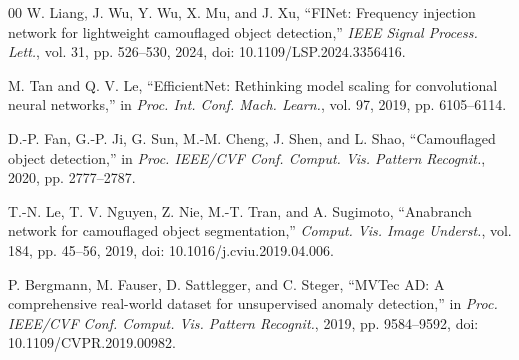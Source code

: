 \documentclass[conference,letterpaper]{IEEEtran}
\begin{document}
\begin{thebibliography}{00}
W. Liang, J. Wu, Y. Wu, X. Mu, and J. Xu, ``FINet: Frequency injection network for lightweight camouflaged object detection,'' \textit{IEEE Signal Process. Lett.}, vol. 31, pp. 526--530, 2024, doi: 10.1109/LSP.2024.3356416.

M. Tan and Q. V. Le, ``EfficientNet: Rethinking model scaling for convolutional neural networks,'' in \textit{Proc. Int. Conf. Mach. Learn.}, vol. 97, 2019, pp. 6105--6114.

D.-P. Fan, G.-P. Ji, G. Sun, M.-M. Cheng, J. Shen, and L. Shao, ``Camouflaged object detection,'' in \textit{Proc. IEEE/CVF Conf. Comput. Vis. Pattern Recognit.}, 2020, pp. 2777--2787.

T.-N. Le, T. V. Nguyen, Z. Nie, M.-T. Tran, and A. Sugimoto, ``Anabranch network for camouflaged object segmentation,'' \textit{Comput. Vis. Image Underst.}, vol. 184, pp. 45--56, 2019, doi: 10.1016/j.cviu.2019.04.006.

P. Bergmann, M. Fauser, D. Sattlegger, and C. Steger, ``MVTec AD: A comprehensive real-world dataset for unsupervised anomaly detection,'' in \textit{Proc. IEEE/CVF Conf. Comput. Vis. Pattern Recognit.}, 2019, pp. 9584--9592, doi: 10.1109/CVPR.2019.00982.
\end{thebibliography}
\end{document}
